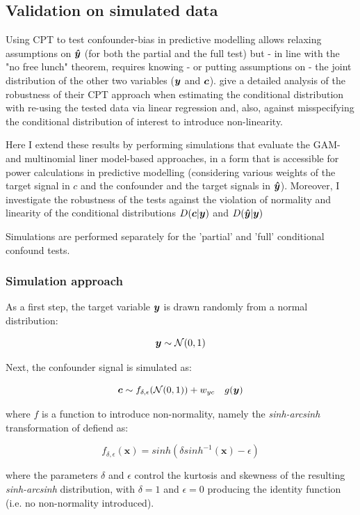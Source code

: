 \documentclass{article}
\begin{document}
\subsection{Validation on simulated data}

Using CPT to test confounder-bias in predictive modelling allows relaxing assumptions on $\boldsymbol{\hat{y}}$ (for both the partial and the full test) but - in line with the "no free lunch" theorem, requires knowing - or putting assumptions on - the joint distribution of the other two variables ($\boldsymbol{y}$ and $\boldsymbol{c}$). 
\cite{berrett2020conditional} give a detailed analysis of the robustness of their CPT approach when estimating the conditional distribution with re-using the tested data via linear regression and, also, against misspecifying the conditional distribution of interest to introduce non-linearity.

Here I extend these results by performing simulations that evaluate the GAM- and multinomial liner model-based approaches, in a form that is accessible for power calculations in predictive modelling (considering various weights of the target signal in $c$ and the confounder and the target signals in $\boldsymbol{\hat{y}}$).
Moreover, I investigate the robustness of the tests against the violation of normality and linearity of the conditional distributions $D(\boldsymbol{c}|\boldsymbol{y})$ and $D(\boldsymbol{\hat{y}}|\boldsymbol{y})$

Simulations are performed separately for the 'partial' and 'full' conditional confound tests.

\subsubsection*{Simulation approach}
As  a first step, the target variable $\boldsymbol{y}$ is drawn randomly from a normal distribution:

$$ \boldsymbol{y} \sim \mathcal{N}(0, 1) $$

Next, the confounder signal is simulated as:

$$ \boldsymbol{c} \sim f_{\delta, \epsilon}(\mathcal{N}(0, 1)) + w_{yc} \quad g(\boldsymbol{y}) $$

where $f$ is a function to introduce non-normality, namely the \emph{sinh-arcsinh} transformation of \cite{jones2009sinh} defiend as:

$$f_{\delta, \epsilon}(\boldsymbol{x}) = sinh(\delta sinh^{-1}(\boldsymbol{x}) - \epsilon)$$

where the parameters $\delta$ and $\epsilon$ control the kurtosis and skewness of the resulting \emph{sinh-arcsinh} distribution, with $\delta=1$ and $\epsilon=0$ producing the identity function (i.e. no non-normality introduced).
\end{document}
